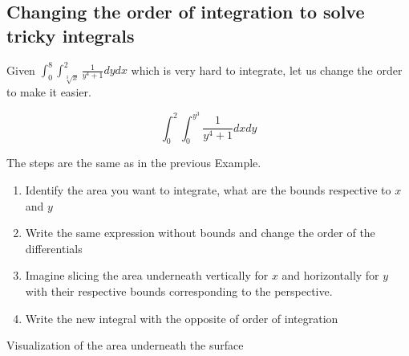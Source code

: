 \subsection{Changing the order of integration to solve tricky integrals}

Given \(\int_{0}^{8}\int_{\sqrt[3]{x}}^{2} \frac{1}{y^4 +1}dy dx\) which is very hard to integrate, 
let us change the order to make it easier.

\[
    \int_{0}^{2}\int_{0}^{y^3} \frac{1}{y^4 +1}dx dy
\]

The steps are the same as in the previous Example.

\begin{enumerate}

    \item Identify the area you want to integrate, what are the bounds respective to \(x\) and \(y\)

    \item Write the same expression without bounds and change the order of the differentials

    \item Imagine slicing the area underneath vertically for \(x\) and horizontally for \(y\) with their 
          respective bounds corresponding to the perspective.

    \item Write the new integral with the opposite of order of integration

\end{enumerate}

\begin{center}

    Visualization of the area underneath the surface
    \smallskip

\end{center}

